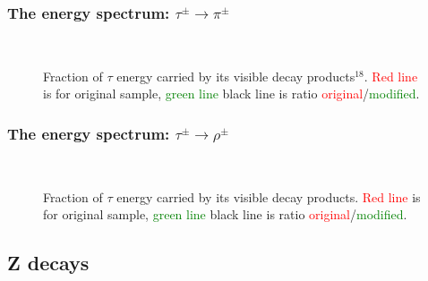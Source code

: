 \subsubsection{ The energy spectrum: $\tau^\pm \to \pi^\pm$}
\vspace{1\baselineskip}

\begin{figure}[h!]
\centering 
{}
 \\
\caption{  Fraction of $\tau$ energy carried by its visible  decay products$^{18}$.
\textcolor{red}{Red line} is for original sample,
\textcolor{green}{green line} \greenlineis
black line is ratio \textcolor{red}{original}/\textcolor{green}{modified}.
}
\end{figure}

\newpage
\subsubsection{ The energy spectrum: $\tau^\pm \to \rho^\pm$}
\vspace{1\baselineskip}

\begin{figure}[h!]
\centering 
{}
 \\
\caption{Fraction of $\tau$ energy carried by its visible  decay products.
\textcolor{red}{Red line} is  for original sample,
\textcolor{green}{green line} \greenlineis
black line is ratio \textcolor{red}{original}/\textcolor{green}{modified}.
}
\end{figure}

\newpage

\subsection{Z decays}\label{Sec:Z}

